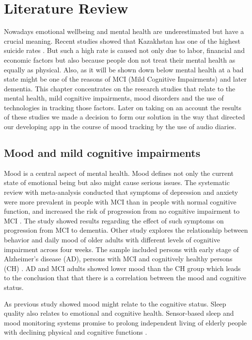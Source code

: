 \chapter{Literature Review}\label{ch:A}
Nowadays emotional wellbeing and mental health are underestimated but have a crucial meaning. Recent studies showed that Kazakhstan has one of the highest suicide rates \cite{WOS:000670909100001}. But such a high rate is caused not only due to labor, financial and economic factors but also because people don not treat their mental health as equally as physical. Also, as it will be shown down below mental health at a bad state might be one of the reasons of MCI (Mild Cognitive Impairments) and later dementia. This chapter concentrates on the research studies that relate to the mental health, mild cognitive impairments, mood disorders and the use of technologies in tracking those factors. Later on taking on an account the results of these studies we made a decision to form our solution in the way that directed our developing app in the course of mood tracking by the use of audio diaries.

\section{Mood and mild cognitive impairments}
Mood is a central aspect of mental health. Mood defines not only the current state of emotional being but also might cause serious issues. The systematic review with meta-analysis conducted that symptoms of depression and anxiety were more prevalent in people with MCI than in people with normal cognitive function, and increased the risk of progression from no cognitive impairment to MCI \cite{yates_clare_woods_2013}. The study showed results regarding the effect of such symptoms on progression from MCI to dementia. Other study explores the relationship between behavior and daily mood of older adults with different levels of cognitive impairment across four weeks. The sample included persons with early stage of Alzheimer's disease (AD), persons with MCI and cognitively healthy persons (CH) \cite{WOS:000346995600002}. AD and MCI adults showed lower mood than the CH group which leads to the conclusion that that there is a correlation between the mood and cognitive status.

As previous study showed mood might relate to the cognitive status. Sleep quality also relates to emotional and cognitive health. Sensor-based sleep and mood monitoring systems promise to prolong independent living of elderly people with declining physical and cognitive functions \cite{WOS:000591565600071}. 

